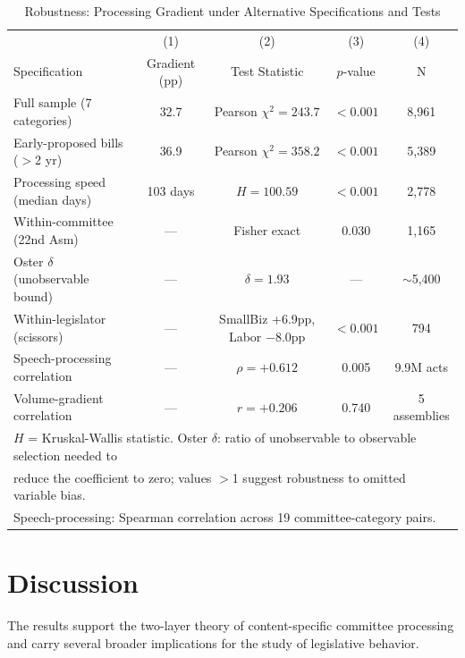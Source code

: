 \documentclass[11pt]{article}
\begin{document}
\begin{table}[htbp]
\centering
\caption{Robustness: Processing Gradient under Alternative Specifications and Tests}
\label{tab:robust}
\begin{tabular}{lcccc}
\toprule
& (1) & (2) & (3) & (4) \\
Specification & Gradient (pp) & Test Statistic & $p$-value & N \\
\midrule
Full sample (7 categories)             & 32.7 & Pearson $\chi^2 = 243.7$ & $<0.001$ & 8,961 \\
Early-proposed bills ($>$2 yr)         & 36.9 & Pearson $\chi^2 = 358.2$ & $<0.001$ & 5,389 \\
Processing speed (median days)         & 103 days & $H = 100.59$ & $<0.001$  & 2,778 \\
Within-committee (22nd Asm)            & --- & Fisher exact     & 0.030       & 1,165 \\
Oster $\delta$ (unobservable bound)    & --- & $\delta = 1.93$ & ---          & $\sim$5,400 \\
Within-legislator (scissors)           & --- & SmallBiz +6.9pp, Labor $-$8.0pp & $<0.001$ & 794 \\
Speech-processing correlation          & --- & $\rho = +0.612$ & 0.005        & 9.9M acts \\
Volume-gradient correlation            & --- & $r = +0.206$    & 0.740        & 5 assemblies \\
\bottomrule
\multicolumn{5}{l}{\footnotesize $H$ = Kruskal-Wallis statistic. Oster $\delta$: ratio of unobservable to observable selection needed to} \\
\multicolumn{5}{l}{\footnotesize reduce the coefficient to zero; values $>$1 suggest robustness to omitted variable bias.} \\
\multicolumn{5}{l}{\footnotesize Speech-processing: Spearman correlation across 19 committee-category pairs.} \\
\end{tabular}
\end{table}


\section{Discussion}
\label{sec:discussion}

The results support the two-layer theory of content-specific committee processing and carry several broader implications for the study of legislative behavior.
\end{document}
